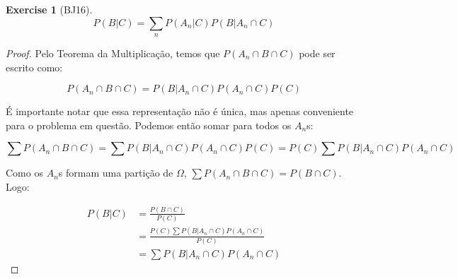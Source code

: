 \documentclass[
]{article}
\theoremstyle{definition}
\theoremstyle{definition}
\theoremstyle{definition}
\newtheorem{exercise}{Exercise}[section]
\theoremstyle{definition}
\theoremstyle{remark}
\begin{document}
\begin{exercise}[BJ16]
\begin{equation*}
P(B|C) = \sum_{n}P(A_{n}|C)P(B|A_{n} \cap C)
\end{equation*}

\begin{proof}
Pelo Teorema da Multiplicação, temos que \(P(A_{n} \cap B \cap C)\) pode ser escrito como:

\begin{equation*}
P(A_{n} \cap B \cap C) = P(B|A_{n} \cap C) P(A_{n} \cap C) P(C)
\end{equation*}

É importante notar que essa representação não é única, mas apenas conveniente para o problema em questão. Podemos então somar para todos os \(A_{n}\)s:

\begin{equation*}
\sum P(A_{n} \cap B \cap C) = \sum P(B|A_{n} \cap C) P(A_{n} \cap C) P(C) = P(C) \sum P(B|A_{n} \cap C) P(A_{n} \cap C)
\end{equation*}

Como os \(A_{n}\)s formam uma partição de \(\Omega\), \(\sum P(A_{n} \cap B \cap C) = P(B \cap C)\). Logo:

\begin{align*}
P(B|C) &= \frac{P(B \cap C)}{P(C)} \\
&= \frac{P(C) \sum P(B|A_{n} \cap C) P(A_{n} \cap C)}{P(C)} \\
&= \sum P(B|A_{n} \cap C) P(A_{n} \cap C)
\end{align*}
\end{proof}

\end{exercise}
\end{document}
